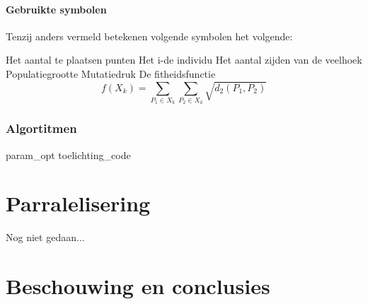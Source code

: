 \subsection{Gebruikte symbolen}
Tenzij anders vermeld betekenen volgende symbolen het volgende:
\begin{itemize}
 Het aantal te plaatsen punten
 Het i-de individu 
 Het aantal zijden van de veelhoek
 Populatiegrootte
 Mutatiedruk 
 De fitheidsfunctie \[f(X_k)= \sum_{P_1 \in X_k}\sum_{P_2 \in X_k} \sqrt{d_2(P_1,P_2)} \]
\end{itemize}



\section{Algortitmen}
%







 {param_opt}
 {toelichting_code}


\part{Parralelisering}
Nog niet gedaan...

\part{Beschouwing en conclusies}


